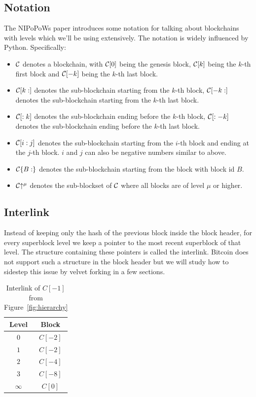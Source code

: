 \subsection{Notation}
The NIPoPoWs paper introduces some notation for talking about blockchains with levels which we'll be using extensively. The notation is widely influenced by Python. Specifically:

\begin{itemize}
  \item $\mathcal{C}$ denotes a blockchain, with $\mathcal{C}[0]$ being the genesis block, $\mathcal{C}[k]$ being the $k$-th first block and $\mathcal{C}[-k]$ being the $k$-th last block.
  \item $\mathcal{C}[k:]$ denotes the sub-blockchain starting from the $k$-th block, $\mathcal{C}[-k:]$ denotes the sub-blockchain starting from the $k$-th last block.
  \item $\mathcal{C}[:k]$ denotes the sub-blockchain ending before the $k$-th block, $\mathcal{C}[:-k]$ denotes the sub-blockchain ending before the $k$-th last block.
  \item $\mathcal{C}[i:j]$ denotes the sub-blockchain starting from the $i$-th block and ending at the $j$-th block. $i$ and $j$ can also be negative numbers similar to above.
  \item $\mathcal{C}\{B:\}$ denotes the sub-blockchain starting from the block with block id $B$.
  \item $\mathcal{C}\negthickspace\uparrow^\mu$ denotes the sub-blockset of $\mathcal{C}$ where all blocks are of level $\mu$ or higher.
\end{itemize}

\subsection{Interlink}
Instead of keeping only the hash of the previous block inside the block header, for every superblock level we keep a pointer to the most recent superblock of that level. The structure containing these pointers is called the interlink. Bitcoin does not support such a structure in the block header but we will study how to sidestep this issue by velvet forking in a few sections.

\begin{table}
  \centering
  \begin{tabular}{|c|c|}
    \hline
    Level & Block \\
    \hline
    $0$ & $C[-2]$ \\
    $1$ & $C[-2]$ \\
    $2$ & $C[-4]$ \\
    $3$ & $C[-8]$ \\
    $\infty$ & $C[0]$ \\
    \hline
  \end{tabular}
  \caption{Interlink of $C[-1]$ from Figure~\ref{fig:hierarchy}}
  \label{table:interlink-example}
\end{table}

